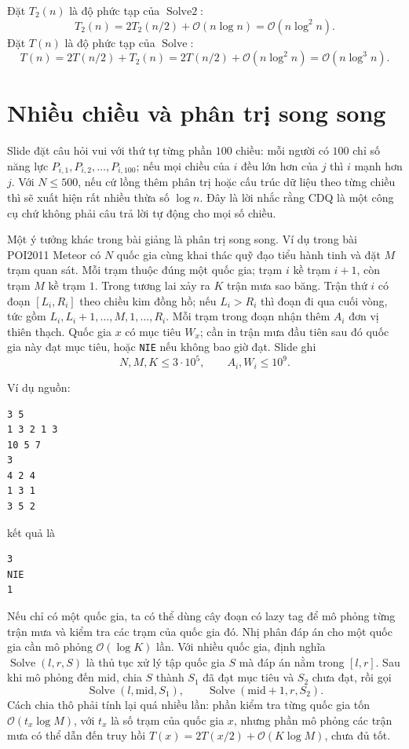 \documentclass[11pt]{article}
\newcommand{\Oh}{\mathcal{O}}
\newcommand{\midp}{\mathrm{mid}}
\newcommand{\Solve}{\operatorname{Solve}}
\newcommand{\SolveTwo}{\operatorname{Solve2}}
\begin{document}
Đặt \(T_2(n)\) là độ phức tạp của \(\SolveTwo\):
\[
  T_2(n)=2T_2(n/2)+\Oh(n\log n)=\Oh(n\log^2 n).
\]
Đặt \(T(n)\) là độ phức tạp của \(\Solve\):
\[
  T(n)=2T(n/2)+T_2(n)
      =2T(n/2)+\Oh(n\log^2 n)
      =\Oh(n\log^3 n).
\]

\section{Nhiều chiều và phân trị song song}

Slide đặt câu hỏi vui với thứ tự từng phần \(100\) chiều: mỗi người có
\(100\) chỉ số năng lực \(P_{i,1},P_{i,2},\ldots,P_{i,100}\); nếu mọi chiều
của \(i\) đều lớn hơn của \(j\) thì \(i\) mạnh hơn \(j\). Với \(N\le 500\),
nếu cứ lồng thêm phân trị hoặc cấu trúc dữ liệu theo từng chiều thì sẽ xuất
hiện rất nhiều thừa số \(\log n\). Đây là lời nhắc rằng CDQ là một công cụ
chứ không phải câu trả lời tự động cho mọi số chiều.

Một ý tưởng khác trong bài giảng là phân trị song song. Ví dụ trong bài
POI2011 Meteor có \(N\) quốc gia cùng khai thác quỹ đạo tiểu hành tinh và đặt
\(M\) trạm quan sát. Mỗi trạm thuộc đúng một quốc gia; trạm \(i\) kề trạm
\(i+1\), còn trạm \(M\) kề trạm \(1\). Trong tương lai xảy ra \(K\) trận mưa
sao băng. Trận thứ \(i\) có đoạn \([L_i,R_i]\) theo chiều kim đồng hồ; nếu
\(L_i>R_i\) thì đoạn đi qua cuối vòng, tức gồm \(L_i,L_i+1,\ldots,M,1,\ldots,R_i\).
Mỗi trạm trong đoạn nhận thêm \(A_i\) đơn vị thiên thạch. Quốc gia \(x\) có
mục tiêu \(W_x\); cần in trận mưa đầu tiên sau đó quốc gia này đạt mục tiêu,
hoặc \texttt{NIE} nếu không bao giờ đạt. Slide ghi
\[
  N,M,K\le 3\cdot 10^5,\qquad A_i,W_i\le 10^9.
\]

Ví dụ nguồn:
\begin{verbatim}
3 5
1 3 2 1 3
10 5 7
3
4 2 4
1 3 1
3 5 2
\end{verbatim}
kết quả là
\begin{verbatim}
3
NIE
1
\end{verbatim}

Nếu chỉ có một quốc gia, ta có thể dùng cây đoạn có lazy tag để mô phỏng từng
trận mưa và kiểm tra các trạm của quốc gia đó. Nhị phân đáp án cho một quốc
gia cần mô phỏng \(\Oh(\log K)\) lần. Với nhiều quốc gia, định nghĩa
\(\Solve(l,r,S)\) là thủ tục xử lý tập quốc gia \(S\) mà đáp án nằm trong
\([l,r]\). Sau khi mô phỏng đến \(\midp\), chia \(S\) thành \(S_1\) đã đạt
mục tiêu và \(S_2\) chưa đạt, rồi gọi
\[
  \Solve(l,\midp,S_1),\qquad \Solve(\midp+1,r,S_2).
\]
Cách chia thô phải tính lại quá nhiều lần: phần kiểm tra từng quốc gia tốn
\(\Oh(t_x\log M)\), với \(t_x\) là số trạm của quốc gia \(x\), nhưng phần mô
phỏng các trận mưa có thể dẫn đến truy hồi \(T(x)=2T(x/2)+\Oh(K\log M)\), chưa
đủ tốt.
\end{document}
